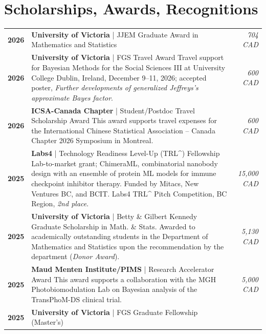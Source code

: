 \documentclass[letterpaper,11pt]{article}
\begin{document}
\section{Scholarships, Awards, Recognitions}
\small
\renewcommand{\arraystretch}{1.5}
\begin{xltabular}{\textwidth}{@{}p{0.1\textwidth}X@{\hspace{0.5cm}}r@{}}
\toprule
\midrule
\textbf{2026} & \textbf{University of Victoria} | JJEM Graduate Award in Mathematics and Statistics & \textit{704 CAD} \\
\addlinespace
\textbf{2026} & \textbf{University of Victoria} | FGS Travel Award \newline
\small Travel support for Bayesian Methods for the Social Sciences III at University College Dublin, Ireland, December 9--11, 2026; accepted poster, \textit{Further developments of generalized Jeffreys's approximate Bayes factor}. & \textit{600 CAD} \\
\addlinespace
\textbf{2026} & \textbf{ICSA-Canada Chapter} | Student/Postdoc Travel Scholarship Award \newline
\small This award supports travel expenses for the International Chinese Statistical Association -- Canada Chapter 2026 Symposium in Montreal. & \textit{600 CAD} \\
\addlinespace
\textbf{2025} & \textbf{Labs4} | Technology Readiness Level-Up (TRL\^{}) Fellowship \newline
\small Lab-to-market grant; ChimeraML, combinatorial nanobody design with an ensemble of protein ML models for immune checkpoint inhibitor therapy. Funded by Mitacs, New Ventures BC, and BCIT. Labs4 TRL\^{} Pitch Competition, BC Region, \textit{2nd place}. & \textit{15,000 CAD} \\
\addlinespace
\textbf{2025} & \textbf{University of Victoria} | Betty \& Gilbert Kennedy Graduate Scholarship in Math. \& Stats. \newline
\small Awarded to academically outstanding students in the Department of Mathematics and Statistics upon the recommendation by the department (\textit{Donor Award}). & \textit{5,130 CAD} \\
\addlinespace
\textbf{2025} & \textbf{Maud Menten Institute/PIMS} | Research Accelerator Award \newline
\small This award supports a collaboration with the MGH Photobiomodulation Lab on Bayesian analysis of the TransPhoM-DS clinical trial. & \textit{5,000 CAD} \\
\addlinespace
\textbf{2025} & \textbf{University of Victoria} | FGS Graduate Fellowship (Master's) \newline

\end{xltabular}
\end{document}
